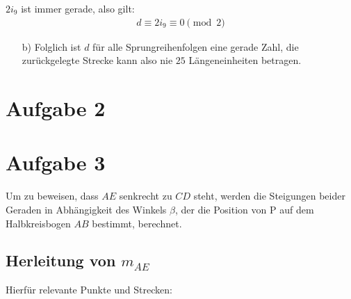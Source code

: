 \documentclass[12pt,a4paper,oneside]{article}
\begin{document}
$2 i_9$ ist immer gerade, also gilt:
\begin{align*}
	d \equiv 2 i_9 \equiv 0 \pmod 2
\end{align*}

\begin{itemize}
	\item[b)] Folglich ist $d$ für alle Sprungreihenfolgen eine gerade Zahl, die zurückgelegte Strecke kann also nie $25$ Längeneinheiten betragen.
\end{itemize}

\pagebreak
{}
\section[]{Aufgabe 2}

\pagebreak
{}
\section[]{Aufgabe 3}
Um zu beweisen, dass $AE$ senkrecht zu $CD$ steht, werden die Steigungen beider Geraden in Abhängigkeit des Winkels $\beta$, der die Position von P auf dem Halbkreisbogen $AB$ bestimmt, berechnet.

\subsection[]{Herleitung von $m_{AE}$}
Hierfür relevante Punkte und Strecken:
\end{document}
